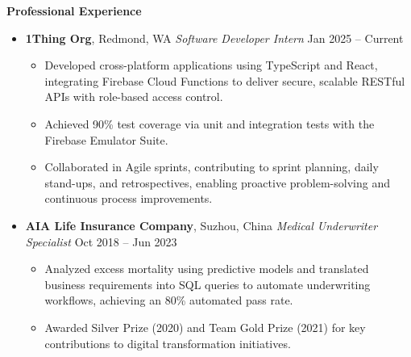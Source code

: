 \documentclass[a4paper,10pt]{article}
\begin{document}
\vspace{0.2cm}
\noindent \textbf{\Large Professional Experience}
\begin{itemize}[leftmargin=*]
    \item \textbf{1Thing Org}, Redmond, WA \hfill \textit{Software Developer Intern} \hfill Jan 2025 – Current
    \begin{itemize}
        \item Developed cross-platform applications using TypeScript and React, integrating Firebase Cloud Functions to deliver secure, scalable RESTful APIs with role-based access control.
        \item Achieved 90\% test coverage via unit and integration tests with the Firebase Emulator Suite.
        \item Collaborated in Agile sprints, contributing to sprint planning, daily stand-ups, and retrospectives, enabling proactive problem-solving and continuous process improvements.
    \end{itemize}

    \item \textbf{AIA Life Insurance Company}, Suzhou, China \hfill \textit{Medical Underwriter Specialist} \hfill Oct 2018 – Jun 2023
    \begin{itemize}
        \item Analyzed excess mortality using predictive models and translated business requirements into SQL queries to automate underwriting workflows, achieving an 80\% automated pass rate.
        \item Awarded Silver Prize (2020) and Team Gold Prize (2021) for key contributions to digital transformation initiatives.
    \end{itemize}
\end{itemize}
\end{document}
